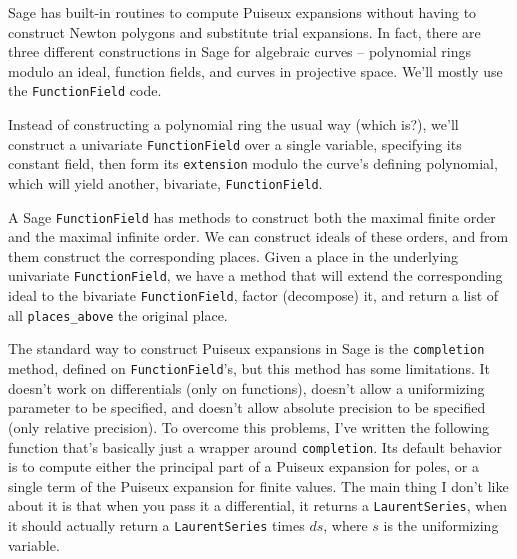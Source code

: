 \vfill\eject
{}

Sage has built-in routines to compute Puiseux expansions without having to
construct Newton polygons and substitute trial expansions.
In fact, there are three different
constructions in Sage for algebraic curves -- polynomial rings
modulo an ideal, function fields, and curves in projective space.
We'll mostly use the {\tt FunctionField} code.

Instead of constructing a polynomial ring the usual way (which is?), we'll
construct a univariate {\tt FunctionField} over a single variable, specifying its
constant field, then form its {\tt extension} modulo the curve's defining polynomial,
which will yield another, bivariate, {\tt FunctionField}.

A Sage {\tt FunctionField} has methods to construct both the maximal finite order
and the maximal infinite order.
We can construct ideals of these orders, and from them
construct the corresponding places.  Given a place in the underlying univariate
{\tt FunctionField}, we have a method that will extend the corresponding ideal
to the bivariate {\tt FunctionField}, factor (decompose) it, and return a list
of all {\tt places\_above} the original place.

The standard way to construct Puiseux expansions in Sage is the {\tt completion} method,
defined on {\tt FunctionField}'s,
but this method has some limitations.  It doesn't work on
differentials (only on functions), doesn't allow a uniformizing parameter to be
specified, and doesn't allow absolute precision to be specified (only relative precision).
To overcome this problems, I've written the following function that's basically just
a wrapper around {\tt completion}.  Its default behavior is to compute either
the principal part of a Puiseux expansion for poles, or a single term of the Puiseux
expansion for finite values.
The main thing I don't like about it is that
when you pass it a differential, it returns a {\tt LaurentSeries}, when it should actually
return a {\tt LaurentSeries} times $ds$, where $s$ is the uniformizing variable.

